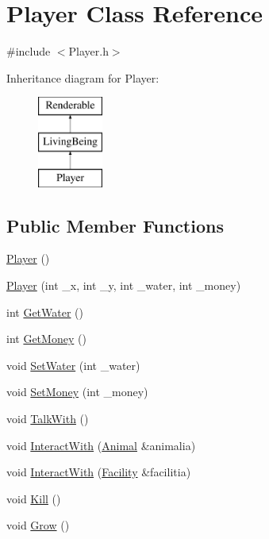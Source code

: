 \hypertarget{classPlayer}{}\section{Player Class Reference}
\label{classPlayer}


{\ttfamily \#include $<$Player.\+h$>$}

Inheritance diagram for Player\+:\begin{figure}[H]
\begin{center}
\leavevmode
\includegraphics[height=3.000000cm]{classPlayer}
\end{center}
\end{figure}
\subsection*{Public Member Functions}
\begin{DoxyCompactItemize}
\item 
\mbox{\hyperlink{classPlayer_affe0cc3cb714f6deb4e62f0c0d3f1fd8}{Player}} ()
\item 
\mbox{\hyperlink{classPlayer_a137fd46dd7dafa0d2fd5945bd95e028a}{Player}} (int \+\_\+x, int \+\_\+y, int \+\_\+water, int \+\_\+money)
\item 
int \mbox{\hyperlink{classPlayer_abfe3d14f5555afe748a03e67c9627875}{Get\+Water}} ()
\item 
int \mbox{\hyperlink{classPlayer_a28e2f3a0b4ed47cfe7950029ad33878f}{Get\+Money}} ()
\item 
void \mbox{\hyperlink{classPlayer_af63a1b8623e2dd0ddd420958a4896974}{Set\+Water}} (int \+\_\+water)
\item 
void \mbox{\hyperlink{classPlayer_ab94b37d55eb3f41717815c352d229069}{Set\+Money}} (int \+\_\+money)
\item 
void \mbox{\hyperlink{classPlayer_ab9c49529f7a58aa62d8d78a5aa025b67}{Talk\+With}} ()
\item 
void \mbox{\hyperlink{classPlayer_a0f9bce476bbda5137e3a70e0e741f238}{Interact\+With}} (\mbox{\hyperlink{classAnimal}{Animal}} \&animalia)
\item 
void \mbox{\hyperlink{classPlayer_a1a09445ee1de62d3d620bc3fe7339df9}{Interact\+With}} (\mbox{\hyperlink{classFacility}{Facility}} \&facilitia)
\item 
void \mbox{\hyperlink{classPlayer_a0c74d6bd430490417bb34e9abc233bb7}{Kill}} ()
\item 
void \mbox{\hyperlink{classPlayer_a91c92058dc2edc2a2a954abb6806cf3a}{Grow}} ()
\end{DoxyCompactItemize}
